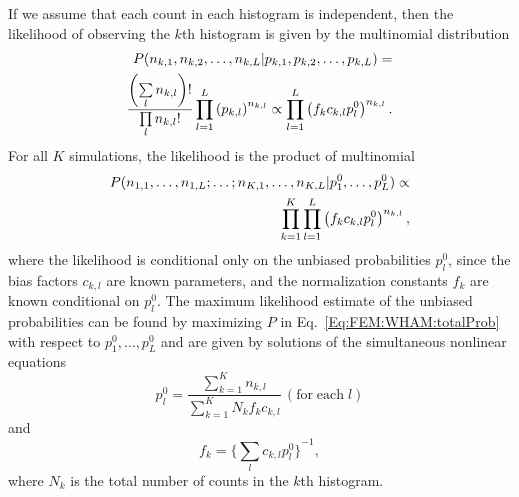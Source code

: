 If we assume that each count in each histogram is independent, then the likelihood of observing the $k$th histogram is given by the multinomial distribution
\begin{align}
P(n_{k,1},n_{k,2},\dots,n_{k,L}|p_{k,1},p_{k,2},\dots,p_{k,L})=\notag\\
\frac{\left(\sum\limits_l n_{k,l}\right)!}{\prod\limits_l n_{k,l}!}\prod\limits_{l=1}^L\left(p_{k,l}\right)^{n_{k,l}}\propto\prod\limits_{l=1}^{L}\left(f_kc_{k,l}p_l^0\right)^{n_{k,l}}.
\end{align}
For all $K$ simulations, the likelihood is the product of multinomial
\begin{align}
P(n_{1,1},\dots,n_{1,L};\dots;n_{K,1},\dots,n_{K,L}|p_1^0,\dots,p_L^0)\propto\notag\\
\prod\limits_{k=1}^K\prod\limits_{l=1}^{L}\left(f_kc_{k,l}p_l^0\right)^{n_{k,l}},
\label{Eq:FEM:WHAM:totalProb}
\end{align}
where the likelihood is conditional only on the unbiased probabilities $p_l^0$, since the bias factors $c_{k,l}$ are known parameters, and the normalization constants $f_k$ are known conditional on $p_l^0$. The maximum likelihood estimate of the unbiased probabilities can be found by maximizing $P$ in Eq.~\ref{Eq:FEM:WHAM:totalProb} with respect to $p_1^0,\dots,p_L^0$ and are given by solutions of the simultaneous nonlinear equations
\begin{equation}
p_l^0=\frac{\sum\limits_{k=1}^K n_{k,l}}{\sum\limits_{k=1}^K N_kf_kc_{k,l}}\, (\mathrm{for\; each}\;l)
\end{equation}
and
\begin{equation}
f_k={\{\sum\limits_lc_{k,l}p_l^0\}}^{-1},
\end{equation}
where $N_k$ is the total number of counts in the $k$th histogram.

